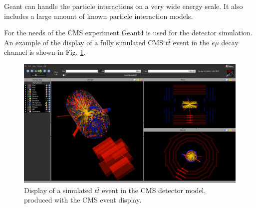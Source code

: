 Geant can handle the particle interactions on a very wide energy scale. It also includes a large amount of known particle interaction models.

For the needs of the CMS experiment Geant4 is used for the detector simulation. An example of the display of a fully simulated CMS $t\bar{t}$ event
in the $e\mu$ decay channel is shown in Fig. \ref{fig:Evt_display}.

 \begin{figure}
  \centering
  \includegraphics[width=1.0\textwidth]{03_simulation/plots/eventDisplay-39649-11661467.png}
  \caption{Display of a simulated $t\bar{t}$ event in the CMS detector model, produced with the CMS event display.}
  \label{fig:Evt_display}
 \end{figure}